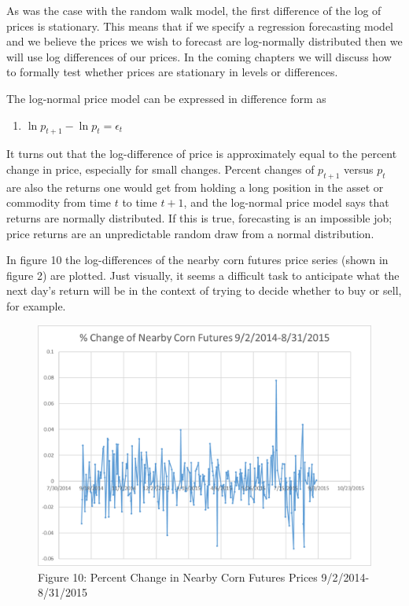 \documentclass[
  letterpaper,
  DIV=11,
  numbers=noendperiod]{scrreprt}
\providecommand{\tightlist}{%
  \setlength{\itemsep}{0pt}\setlength{\parskip}{0pt}}\usepackage{longtable,booktabs,array}
\begin{document}
As was the case with the random walk model, the first difference of the
log of prices is stationary. This means that if we specify a regression
forecasting model and we believe the prices we wish to forecast are
log-normally distributed then we will use log differences of our prices.
In the coming chapters we will discuss how to formally test whether
prices are stationary in levels or differences.

The log-normal price model can be expressed in difference form as

\begin{enumerate}
\def\labelenumi{(\arabic{enumi})}
\setcounter{enumi}{6}
\tightlist
\item
  \(\ln{p_{t+1}} - \ln{p_{t}} = \epsilon_t\)
\end{enumerate}

It turns out that the log-difference of price is approximately equal to
the percent change in price, especially for small changes. Percent
changes of \(p_{t+1}\) versus \(p_t\) are also the returns one would get
from holding a long position in the asset or commodity from time \(t\)
to time \(t+1\), and the log-normal price model says that returns are
normally distributed. If this is true, forecasting is an impossible job;
price returns are an unpredictable random draw from a normal
distribution.

In figure 10 the log-differences of the nearby corn futures price series
(shown in figure 2) are plotted. Just visually, it seems a difficult
task to anticipate what the next day's return will be in the context of
trying to decide whether to buy or sell, for example.

\begin{figure}

{\centering \includegraphics{Excel-files/IntroductiontoCommodityTS-Nearby_construct_files/image002.png}

}

\caption{Figure 10: Percent Change in Nearby Corn Futures Prices
9/2/2014-8/31/2015}

\end{figure}
\end{document}
